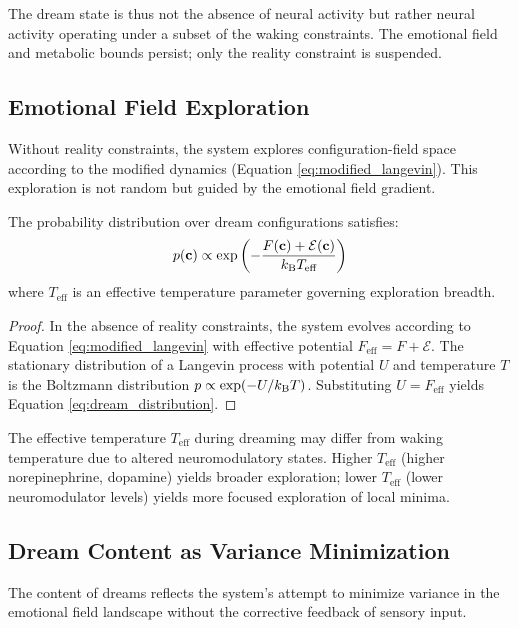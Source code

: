The dream state is thus not the absence of neural activity but rather neural activity operating under a subset of the waking constraints. The emotional field and metabolic bounds persist; only the reality constraint is suspended.

\subsection{Emotional Field Exploration}

Without reality constraints, the system explores configuration-field space according to the modified dynamics (Equation \ref{eq:modified_langevin}). This exploration is not random but guided by the emotional field gradient.

\begin{theorem}
\label{thm:dream_trajectory}
The probability distribution over dream configurations satisfies:
\begin{equation}
p(\mathbf{c}) \propto \exp\left(-\frac{F(\mathbf{c}) + \mathcal{E}(\mathbf{c})}{k_{\mathrm{B}} T_{\text{eff}}}\right)
\label{eq:dream_distribution}
\end{equation}
where $T_{\text{eff}}$ is an effective temperature parameter governing exploration breadth.
\end{theorem}

\begin{proof}
In the absence of reality constraints, the system evolves according to Equation \ref{eq:modified_langevin} with effective potential $F_{\text{eff}} = F + \mathcal{E}$. The stationary distribution of a Langevin process with potential $U$ and temperature $T$ is the Boltzmann distribution $p \propto \exp(-U/k_{\mathrm{B}} T)$. Substituting $U = F_{\text{eff}}$ yields Equation \ref{eq:dream_distribution}.
\end{proof}

The effective temperature $T_{\text{eff}}$ during dreaming may differ from waking temperature due to altered neuromodulatory states. Higher $T_{\text{eff}}$ (higher norepinephrine, dopamine) yields broader exploration; lower $T_{\text{eff}}$ (lower neuromodulator levels) yields more focused exploration of local minima.

\subsection{Dream Content as Variance Minimization}

The content of dreams reflects the system's attempt to minimize variance in the emotional field landscape without the corrective feedback of sensory input.

